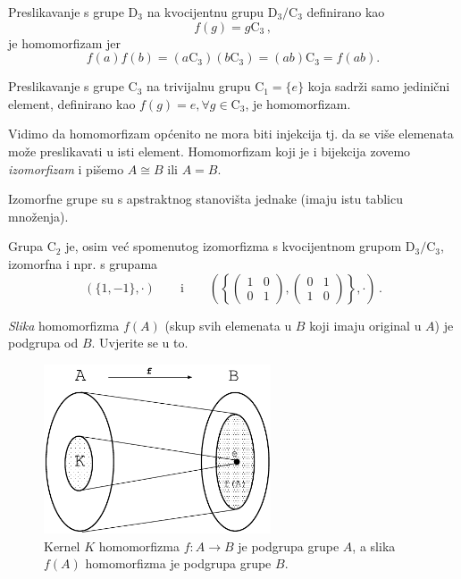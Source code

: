 \begin{primjer}
    Preslikavanje s grupe $\mathrm{D}_3$ na kvocijentnu grupu
    $\mathrm{D}_3/\mathrm{C}_3$ definirano kao 
    \[
        f(g) = g\mathrm{C}_3 \,,
    \] je homomorfizam jer
    \[
        f(a) f(b) = (a \mathrm{C}_3) (b \mathrm{C}_3 ) =
        (a b) \mathrm{C}_3 = f(a b)
    .\] 
\end{primjer}
\begin{primjer}
    Preslikavanje s grupe $\mathrm{C}_3$ na trivijalnu grupu $\mathrm{C}_1 = \{e\}$
    koja sadrži samo jedinični element, definirano kao $f(g) = e,
    \forall g\in\mathrm{C}_3$, je homomorfizam.
    \label{pr:C3toC1}
\end{primjer}

Vidimo da homomorfizam općenito ne mora biti injekcija tj. da se više
elemenata može preslikavati u isti element.
Homomorfizam koji je i bijekcija zovemo \emph{izomorfizam} i
pišemo $A\cong B$ ili $A=B$.

Izomorfne grupe su s apstraktnog stanovišta jednake (imaju
istu tablicu množenja).

\begin{primjer}
Grupa C$_2$ je, osim već spomenutog izomorfizma s
kvocijentnom grupom $\mathrm{D}_3/\mathrm{C}_3$, izomorfna i
npr. s grupama 
$$
(\{1, -1\},\cdot) \qquad \text{i} \qquad \left(\left\{
\begin{pmatrix}
1 & 0 \\ 0 & 1
\end{pmatrix},
\begin{pmatrix}
0 & 1 \\ 1 & 0
\end{pmatrix}
\right\},\cdot\right)\,.$$
\end{primjer}

\emph{Slika} homomorfizma $f(A)$ (skup svih elemenata u $B$ koji imaju original u $A$) 
je podgrupa od $B$. Uvjerite se u to.


\begin{figure}[htpb]
    \centering
    \includegraphics[width=0.6\textwidth]{pics/homomorfizam}
    \caption{Kernel $K$ homomorfizma $f:A\to B$ je podgrupa grupe $A$,
    a slika $f(A)$ homomorfizma je podgrupa grupe $B$.}
    \label{fig:kernelslika}
\end{figure}


